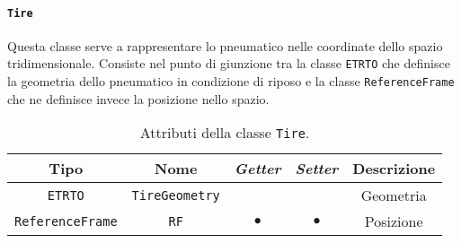 \paragraph{\texttt{Tire}}
Questa classe serve a rappresentare lo pneumatico nelle coordinate dello spazio tridimensionale. Consiste nel punto di giunzione tra la classe \texttt{ETRTO} che definisce la geometria dello pneumatico in condizione di riposo e la classe \texttt{ReferenceFrame} che ne definisce invece la posizione nello spazio.
\begin{table}[h!]
	\centering
	\begin{tabular}{|c|c|c|c|c|}
		\hline 
		\textbf{Tipo} & \textbf{Nome} & \textit{\textbf{Getter}} & \textit{\textbf{Setter}} & \textbf{Descrizione} \\ \hline 
		\texttt{ETRTO} & \texttt{TireGeometry} & & & Geometria \\ \hline 
		\texttt{ReferenceFrame} & \texttt{RF} & $\bullet$ & $\bullet$ & Posizione \\ \hline
	\end{tabular}
	\caption{Attributi della classe \texttt{Tire}.}
	\label{}
\end{table}
%
